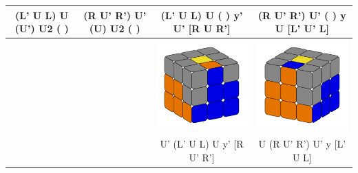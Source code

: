 \documentclass[12pt, a3paper]{article}
\newcommand{\scale}{1}
\begin{document}
\begin{center}
\begin{longtable}{c|c||c|c}
	(L' U L) U (U') U2 ( ) & (R U' R') U' (U) U2 ( ) & (L' U L) U ( ) y' U' [R U R'] & (R U' R') U' ( ) y U [L' U' L] \\
	\hline
	\hline
	& & \includegraphics[scale=\scale]{19_left} & \includegraphics[scale=\scale]{19_right} \\
	& & U' (L' U L) U y' [R U' R'] & U (R U' R') U' y [L' U L] \\
	\hline
	\end{longtable}
	\begin{tabular}{c|c|c}
		\hline

\end{tabular}
\end{center}
\end{document}

